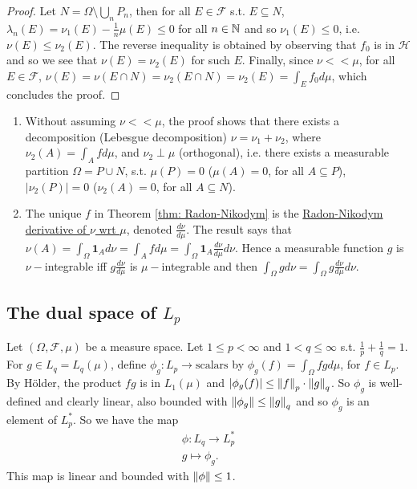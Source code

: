 \documentclass{article}
\begin{document}
\begin{proof}
Let $N=\Omega\setminus \displaystyle\bigcup_n P_n$, then for all $E\in\mathcal{F}$ s.t. $E\subseteq N$, $\lambda_n(E)=\nu_1(E)-\frac{1}{n}\mu(E)\leq 0$ for all $n\in\mathbb{N}$ and so $\nu_1(E)\leq 0$, i.e. $\nu(E)\leq \nu_2(E)$. The reverse inequality is obtained by observing that $f_0$ is in $\mathcal{H}$ and so we see that $\nu(E)=\nu_2(E)$ for such $E$. Finally, since $\nu<<\mu$, for all $E\in\mathcal{F}$, $\nu(E)=\nu(E\cap N)=\nu_2(E\cap N)=\nu_2(E)=\int_E f_0 d\mu$, which concludes the proof.
\end{proof}

\begin{remark}
\begin{enumerate}
    \item Without assuming $\nu<<\mu$, the proof shows that there exists a decomposition (Lebesgue decomposition) $\nu =\nu_1+\nu_2$, where $\nu_2(A)=\int_A f d\mu$, and $\nu_2\perp\mu$ (orthogonal), i.e. there exists a measurable partition $\Omega = P\displaystyle\cup N$, s.t. $\mu(P)=0$ ($\mu(A)=0$, for all $A\subseteq P$), $|\nu_2(P)|=0$ ($\nu_2(A)=0$, for all $A\subseteq N$). 
    \item The unique $f$ in Theorem \ref{thm: Radon-Nikodym} is the \noindent\underline{Radon-Nikodym derivative of $\nu$ wrt $\mu$}, denoted $\frac{d\nu}{d\mu}$. The result says that $\nu(A)=\int_\Omega \mathbf{1}_A d\nu = \int_A f d\mu = \int_\Omega \mathbf{1}_A \frac{d\nu}{d\mu}d\nu$. Hence a measurable function $g$ is $\nu-$integrable iff $g\frac{d\nu}{d\mu}$ is $\mu-$integrable and then $\int_\Omega g d\nu = \int_\Omega g \frac{d\nu}{d\mu}d\nu$.
\end{enumerate}
\end{remark}

\subsection{The dual space of $L_p$}

Let $(\Omega, \mathcal{F}, \mu)$ be a measure space. Let $1\leq p<\infty $ and $1< q\leq \infty$ s.t. $\frac{1}{p}+\frac{1}{q}=1$. For $g\in L_q=L_q(\mu)$, define $\phi_g:L_p\to \text{scalars}$ by $\phi_g(f)=\int_\Omega fg d\mu$, for $f\in L_p$. By H\"{o}lder, the product $fg$ is in $L_1(\mu)$ and $|\phi_g(f)|\leq \left\lVert f\right\rVert_p\cdot \left\lVert g\right\rVert_q$. So $\phi_g$ is well-defined and clearly linear, also bounded with $\left\lVert\phi_g\right\rVert\leq \left\lVert g\right\rVert_q$ and so $\phi_g$ is an element of $L_p^*$. So we have the map
$$
\begin{array}{cc}
    \phi: L_q \to L_p^*\\
     g \mapsto \phi_g. 
\end{array}
$$
\noindent This map is linear and bounded with $\left\lVert\phi\right\rVert\leq 1$.
\end{document}
